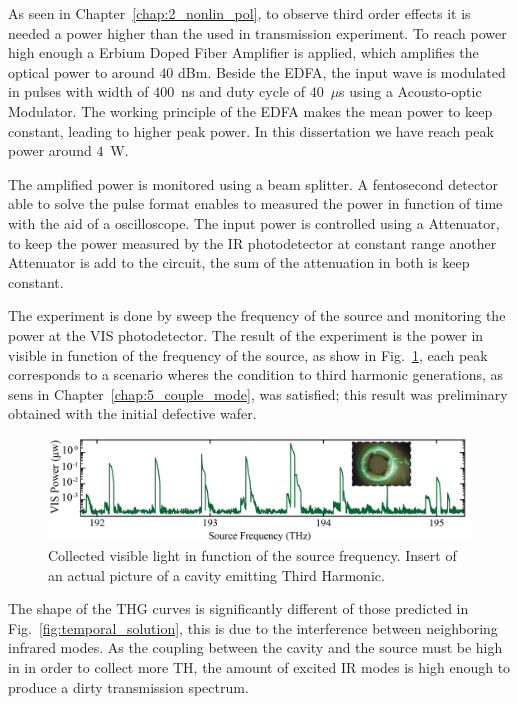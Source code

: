 As seen in Chapter~\ref{chap:2_nonlin_pol}, to observe third order effects it is needed a power higher than the used in transmission experiment. To reach power high enough a Erbium Doped Fiber Amplifier is applied, which amplifies the optical power to around $40$ dBm. Beside the EDFA, the input wave is modulated in pulses with width of $400$~ns and duty cycle of $40$~$\mu$s using a Acousto-optic Modulator. The working principle of the EDFA makes the mean power to keep constant, leading to higher peak power. In this dissertation we have reach peak power around $4$~W.  

The amplified power is monitored using a beam splitter. A fentosecond detector able to solve the pulse format enables to measured the power in function of time with the aid of a oscilloscope. The input power is controlled using a Attenuator, to keep the power measured by the IR photodetector at constant range another Attenuator is add to the circuit, the sum of the attenuation in both is keep constant.  

The experiment is done by sweep the frequency of the source and monitoring the power at the VIS photodetector. The result of the experiment is the power in visible in function of the frequency of the source, as show in Fig.~\ref{fig:thg_broad_map}, each peak corresponds to a scenario wheres the condition to third harmonic generations, as sens in Chapter~\ref{chap:5_couple_mode}, was satisfied; this result was preliminary obtained with the initial defective wafer. 
\begin{figure}[h]
    \centering
    \includegraphics[width = 16cm]{figuras/Dissertation_thg_broad.jpg}
    \caption{Collected visible light in function of the source frequency. Insert of an actual picture of a cavity emitting Third Harmonic.}
    \label{fig:thg_broad_map}
\end{figure}

The shape of the THG curves is significantly different of those predicted in Fig.~\ref{fig:temporal_solution}, this is due to the interference between neighboring infrared modes. As the coupling between the cavity and the source must be high in in order to collect more TH, the amount of excited IR modes is high enough to produce a dirty transmission spectrum. 

